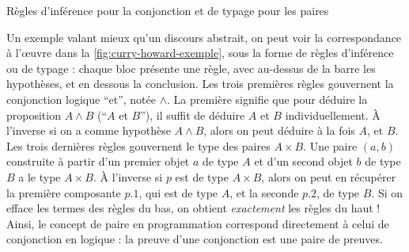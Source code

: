 \begin{marginfigure}




  
  \caption{Règles d’inférence pour la conjonction et de typage pour les paires}
  \label{fig:curry-howard-exemple}
\end{marginfigure}

Un exemple valant mieux qu’un discours abstrait, on peut voir la correspondance à l’œuvre dans la \cref{fig:curry-howard-exemple}, sous la forme de règles d’inférence
ou de typage : chaque bloc présente une règle, avec au-dessus de la barre les
hypothèses, et en dessous la conclusion.
Les trois premières règles gouvernent la conjonction logique “et”, notée $\wedge$.
La première signifie que pour déduire la proposition $A \wedge B$ (“$A$ et $B$”),
il suffit de déduire $A$ et $B$ individuellement.
À l’inverse si on a comme hypothèse $A \wedge B$, alors on peut déduire à la fois $A$, et $B$.
Les trois dernières règles gouvernent le type des paires $A \times B$.
Une paire $(a,b)$ construite à partir d’un premier objet $a$ de type $A$%
 et d’un second objet $b$ de type $B$ a le type $A \times B$.
À l’inverse si $p$ est de type $A \times B$, alors on peut en récupérer la première composante
$p.1$, qui est de type $A$, et la seconde $p.2$, de type $B$.
Si on efface les termes des règles du bas, on obtient \emph{exactement} les règles du haut !
Ainsi, le concept de paire en programmation correspond directement à celui de conjonction
en logique : la preuve d’une conjonction est une paire de preuves.

